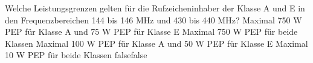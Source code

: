     {Welche Leistungsgrenzen gelten für die Rufzeicheninhaber der Klasse A und E in den Frequenzbereichen 144 bis 146 MHz und 430 bis 440 MHz?}
    {Maximal 750 W PEP für Klasse A und 75 W PEP für Klasse E}
    {Maximal 750 W PEP für beide Klassen}
    {Maximal 100 W PEP für Klasse A und 50 W PEP für Klasse E}
    {Maximal 10 W PEP für beide Klassen}
    {false}{false}